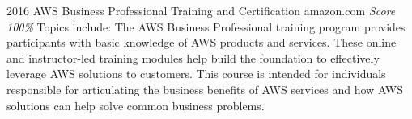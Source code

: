 \documentclass[11pt,a4paper]{moderncv}
\begin{document}
\cventry                                                          %
    {2016}                                                          %
    {AWS Business Professional}                                                          %
    {Training and Certification}                                                          %
    {amazon.com}                                                          %
    {\textit{Score 100\%}}                                                          %
    {                                                          %
        Topics include:                                                          %
            The AWS Business Professional training program provides              %
                participants with basic knowledge of AWS products                %
                and services.                                                    %
            These online and instructor-led training modules help                %
                build the foundation to effectively leverage AWS                 %
                solutions to customers.                                          %
            This course is intended for individuals responsible for              %
                articulating the business benefits of AWS services               %
                and how AWS solutions can help solve common business             %
                problems.                                                        %
    }                                                          %
\end{document}

